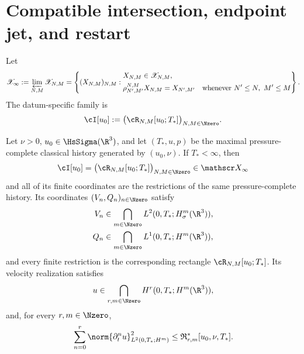 \section{Compatible intersection, endpoint jet, and restart}

\begin{definition}
\label{def:compatible-intersection}
Let
\begin{equation}
 \mathscr X_\infty
 :=\varprojlim_{N,M}\mathscr X_{N,M}
 =\left\{(X_{N,M})_{N,M}:
 \begin{aligned}
 &X_{N,M}\in\mathscr X_{N,M},\\
 &\rho_{N',M'}^{N,M}X_{N,M}=X_{N',M'}
 \quad\text{whenever }N'\le N,\ M'\le M
 \end{aligned}
 \right\}.
 \label{eq:compatible-intersection-space}
\end{equation}
The datum-specific family is
\begin{equation}
 \cI[u_0]
 :=\bigl(\cR_{N,M}[u_0;T_*]\bigr)_{N,M\in\Nzero}.
 \label{eq:compatible-intersection}
\end{equation}
\end{definition}

\begin{theorem}
\label{thm:compatible-inverse-intersection}
Let \(\nu>0\), \(u_0\in\HsSigma(\R^3)\), and let
\((T_*,u,p)\) be the maximal pressure-complete classical history generated
by \((u_0,\nu)\).  If \(T_*<\infty\), then
\begin{equation}
 \cI[u_0]
 =\bigl(\cR_{N,M}[u_0;T_*]\bigr)_{N,M\in\Nzero}
 \in\mathscr X_\infty
 \label{eq:ier-compatible-family}
\end{equation}
and all of its finite coordinates are the restrictions of the same
pressure-complete history.  Its coordinates \((V_n,Q_n)_{n\in\Nzero}\)
satisfy
\begin{align}
 V_n&\in\bigcap_{m\in\Nzero}L^2(0,T_*;H^m_\sigma(\R^3)),
 \label{eq:ier-inverse-velocity-coordinate}\\
 Q_n&\in\bigcap_{m\in\Nzero}L^1(0,T_*;H^m(\R^3)),
 \label{eq:ier-inverse-pressure-coordinate}
\end{align}
and every finite restriction is the corresponding rectangle
\(\cR_{N,M}[u_0;T_*]\).  Its velocity realization satisfies
\begin{equation}
 u\in\bigcap_{r,m\in\Nzero}H^r(0,T_*;H^m(\R^3)),
 \label{eq:mixed-sobolev-intersection}
\end{equation}
and, for every \(r,m\in\Nzero\),
\begin{equation}
 \sum_{n=0}^{r}\norm{\partial_t^nu}_{L^2(0,T_*;H^m)}^2
 \le\mathfrak R_{r,m}^*[u_0,\nu,T_*].
 \label{eq:mixed-sobolev-finite-bound}
\end{equation}
\end{theorem}

